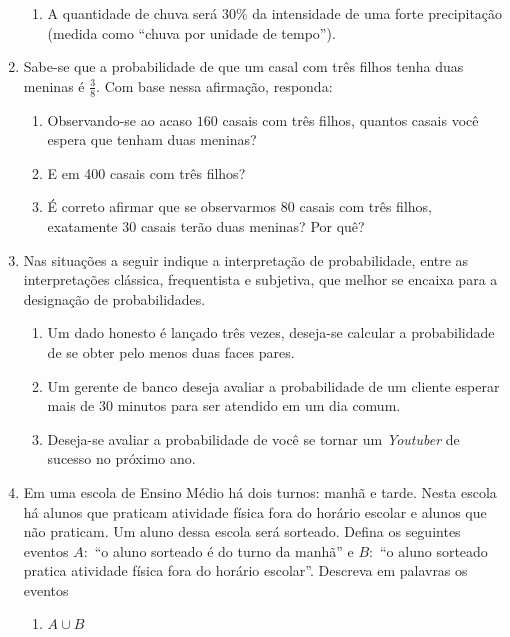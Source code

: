 \begin{enumerate}
\begin{enumerate}
\item {} 
A quantidade de chuva será $30\%$ da intensidade de uma forte precipitação (medida como “chuva por unidade de tempo”).

\end{enumerate}

\item Sabe-se que a probabilidade de que um casal com três filhos tenha duas meninas é \(\frac{3}{8}\). Com base nessa afirmação, responda:
\begin{enumerate}
\item {} 
Observando-se ao acaso $160$ casais com três filhos, quantos casais você espera que tenham duas meninas?

\item {} 
E em 400 casais com três filhos?

\item {} 
É correto afirmar que se observarmos $80$ casais com três filhos, exatamente 30 casais terão duas meninas? Por quê?

\end{enumerate}


\item Nas situações a seguir indique a interpretação de probabilidade, entre as interpretações clássica, frequentista e subjetiva, que melhor se encaixa para a designação de probabilidades.
\begin{enumerate}
\item {} 
Um dado honesto é lançado três vezes, deseja-se calcular a probabilidade de se obter pelo menos duas faces pares.

\item {} 
Um gerente de banco deseja avaliar a probabilidade de um cliente esperar mais de $30$ minutos para ser atendido em um dia comum.

\item {} 
Deseja-se avaliar a probabilidade de você se tornar um \textit{Youtuber} de sucesso no próximo ano.

\end{enumerate}

\item Em uma escola de Ensino Médio há dois turnos: manhã e tarde. Nesta escola há alunos que praticam atividade física fora do horário escolar e alunos que não praticam. Um aluno dessa escola será sorteado. Defina os seguintes eventos \(A:\) “o aluno sorteado é do turno da manhã” e \(B:\) “o aluno sorteado pratica atividade física fora do horário escolar”. Descreva em palavras os eventos
\begin{enumerate}
\item {} 
\(A\cup B\)


\end{enumerate}
\end{enumerate}
